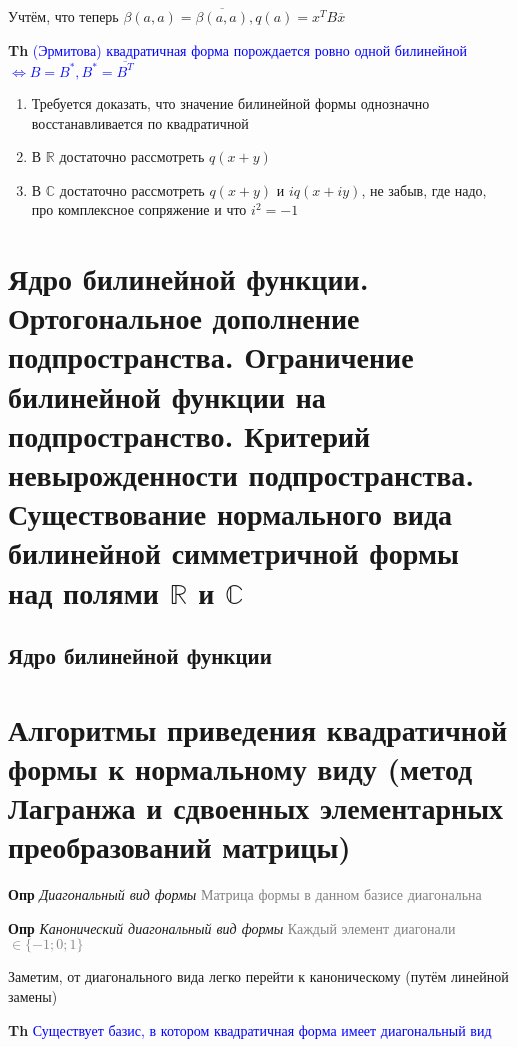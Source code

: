\documentclass[a4paper, 14pt]{article}
\begin{document}
    Учтём, что теперь $\beta (a, a) = \overline{\beta (a, a)}, q(a) =  x^T B \overline{x}$
    
    \textbf{Th} \textcolor{blue}{(Эрмитова) квадратичная форма порождается ровно одной билинейной $\Leftrightarrow B
    = B^*, B^* = \overline{B^T}$}
    
    \begin{enumerate}
        \item Требуется доказать, что значение билинейной формы однозначно восстанавливается по квадратичной
        \item В $\mathbb{R}$ достаточно рассмотреть $q(x + y)$
        \item В $\mathbb{C}$ достаточно рассмотреть $q(x + y)$ и $iq(x + iy)$, не забыв, где надо, про
        комплексное сопряжение и что $i^2 = -1$
    \end{enumerate}
    
    \section{Ядро билинейной функции.
    Ортогональное дополнение подпространства.
    Ограничение билинейной функции на подпространство.
    Критерий невырожденности подпространства.
    Существование нормального вида билинейной симметричной формы над полями $\mathbb{R}$ и $\mathbb{C}$}
    
    \subsection{Ядро билинейной функции}
    
    \section{Алгоритмы приведения квадратичной формы к нормальному виду (метод Лагранжа и сдвоенных элементарных
    преобразований матрицы)}
    
    \textbf{Опр} \textit{Диагональный вид формы} \textcolor{gray}{Матрица формы в данном базисе диагональна}
    
    \textbf{Опр} \textit{Канонический диагональный вид формы} \textcolor{gray}{Каждый элемент диагонали $\in \{-1;0;1\}$}
    
    Заметим, от диагонального вида легко перейти к каноническому (путём линейной замены)
    
    \textbf{Th} \textcolor{blue}{Существует базис, в котором квадратичная форма имеет диагональный вид}
    
\end{document}
